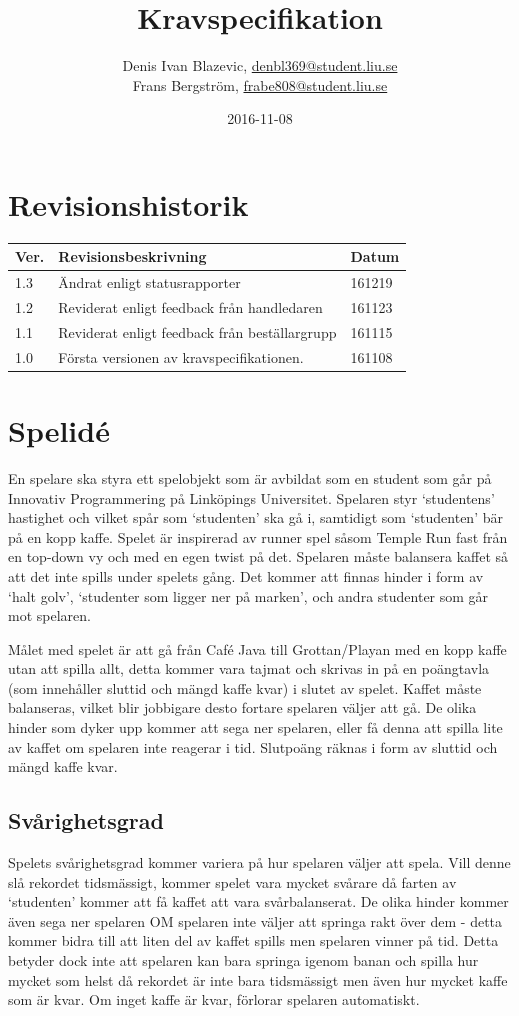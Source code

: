 \documentclass{template}
\author{Denis Ivan Blazevic, \url{denbl369@student.liu.se}\\
  Frans Bergström, \url{frabe808@student.liu.se}\\
    }
\title{Kravspecifikation}
\date{2016-11-08}
\begin{document}
\projectpage

\tableofcontents
\newpage

\section{Revisionshistorik}
\begin{table}[!h]
\begin{tabularx}{\linewidth}{|l|X|l|}
\hline
Ver. & Revisionsbeskrivning & Datum \\\hline
1.3 & Ändrat enligt statusrapporter & 161219 \\\hline
1.2 & Reviderat enligt feedback från handledaren & 161123 \\\hline 
1.1 & Reviderat enligt feedback från beställargrupp & 161115 \\\hline 
1.0 & Första versionen av kravspecifikationen. & 161108 \\\hline
\end{tabularx}
\end{table}


\section{Spelidé}
En spelare ska styra ett spelobjekt som är avbildat som en student som går på Innovativ Programmering på Linköpings Universitet. Spelaren styr `studentens' hastighet och vilket spår som `studenten' ska gå i, samtidigt som `studenten' bär på en kopp kaffe. Spelet är inspirerad av runner spel såsom Temple Run fast från en top-down vy och med en egen twist på det. Spelaren måste balansera kaffet så att det inte spills under spelets gång. Det kommer att finnas hinder i form av `halt golv', `studenter som ligger ner på marken', och andra studenter som går mot spelaren. 

Målet med spelet är att gå från Café Java till Grottan/Playan med en kopp kaffe utan att spilla allt, detta kommer vara tajmat och skrivas in på en poängtavla (som innehåller sluttid och mängd kaffe kvar) i slutet av spelet. Kaffet måste balanseras, vilket blir jobbigare desto fortare spelaren väljer att gå. De olika hinder som dyker upp kommer att sega ner spelaren, eller få denna att spilla lite av kaffet om spelaren inte reagerar i tid. Slutpoäng räknas i form av sluttid och mängd kaffe kvar. 

\subsection{Svårighetsgrad}
Spelets svårighetsgrad kommer variera på hur spelaren väljer att spela. Vill denne slå rekordet tidsmässigt, kommer spelet vara mycket svårare då farten av `studenten' kommer att få kaffet att vara svårbalanserat. De olika hinder kommer även sega ner spelaren OM spelaren inte väljer att springa rakt över dem - detta kommer bidra till att liten del av kaffet spills men spelaren vinner på tid. Detta betyder dock inte att spelaren kan bara springa igenom banan och spilla hur mycket som helst då rekordet är inte bara tidsmässigt men även hur mycket kaffe som är kvar. Om inget kaffe är kvar, förlorar spelaren automatiskt.
\end{document}
